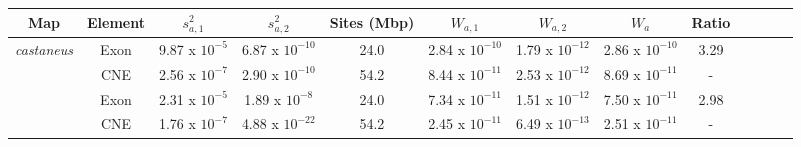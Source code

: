 \begin{tabular}{ccccccccccccc}
\toprule
       Map & Element &        $s^{2}_{a,1}$ &      $s^{2}_{a,2}$ &     Sites (Mbp) & $W_{a,1}$ &    $W_{a,2}$ &   $W_{a}$ & Ratio \\
\midrule
 \multirow{2}{*}{\textit{castaneus}} &    Exon  &  9.87 x $10^{-5}$  & 6.87 x $10^{-10}$  & 24.0 &  2.84 x $10^{-10}$  &  1.79 x $10^{-12}$  &  2.86 x $10^{-10}$  &  3.29 \\
  &     CNE  &  2.56 x $10^{-7}$ &  2.90 x $10^{-10}$  & 54.2 & 8.44 x $10^{-11}$  &  2.53 x $10^{-12}$  &  8.69 x $10^{-11}$  &         - \\ \hdashline
       \multirow{2}{*}{Cox} &     Exon  &  2.31 x $10^{-5}$ &  1.89 x $10^{-8}$  &  24.0 &  7.34 x $10^{-11}$  &  1.51 x $10^{-12}$  &  7.50 x $10^{-11}$ &  2.98 \\
        &     CNE  &  1.76 x $10^{-7}$ &  4.88 x $10^{-22}$  &  54.2 &  2.45 x $10^{-11}$  &  6.49 x $10^{-13}$  &  2.51 x $10^{-11}$ &         - \\
\bottomrule
\end{tabular}
